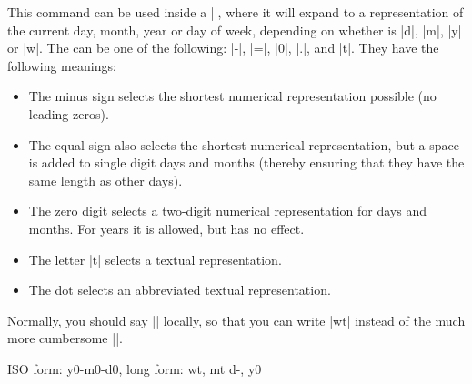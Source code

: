 \begin{command}{\pgfcalendar{}}
\begin{codeexample}[vbox,ignorespaces,preamble={\usepackage{pgfcalendar}}]
\end{codeexample}
\end{command}

\begin{command}{\pgfcalendarshorthand{}}
\label{pgfcalendarshorthand}
    This command can be used inside a |\pgfcalendar|, where it will expand to a
    representation of the current day, month, year or day of week, depending on
    whether  is |d|, |m|, |y| or |w|. The  can
    be one of the following: |-|, |=|, |0|, |.|, and |t|. They have the
    following meanings:
    \begin{itemize}
        \item The minus sign selects the shortest numerical representation
            possible (no leading zeros).
        \item The equal sign also selects the shortest numerical
            representation, but a space is added to single digit days and
            months (thereby ensuring that they have the same length as other
            days).
        \item The zero digit selects a two-digit numerical representation for
            days and months. For years it is allowed, but has no effect.
        \item The letter |t| selects a textual representation.
        \item The dot selects an abbreviated textual representation.
    \end{itemize}
    Normally, you should say |\let\%=\pgfcalendarshorthand| locally, so that
    you can write |\%wt| instead of the much more cumbersome
    ||.
\begin{codeexample}[leave comments,preamble={\usepackage{pgfcalendar}}]
\let\%=\pgfcalendarshorthand
{}
{ ISO form: \%y0-\%m0-\%d0, long form: \%wt, \%mt \%d-, \%y0}
\end{codeexample}
\end{command}


